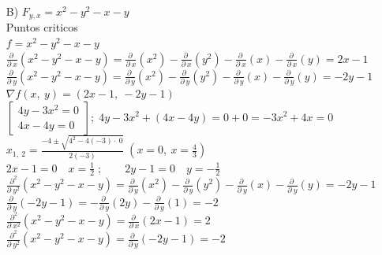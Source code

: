 \documentclass[13pt]{memoir}
\begin{document}
\begin{enumerate}
\item[B)] $F_{y,x}= x^2-y^2-x-y$\\

{\tiny Puntos criticos}\\
$f=x^2-y^2-x-y$\\
$\frac{\partial \:}{\partial \:x}\left(x^2-y^2-x-y\right) =\frac{\partial \:}{\partial \:x}\left(x^2\right)-\frac{\partial \:}{\partial \:x}\left(y^2\right)-\frac{\partial \:}{\partial \:x}\left(x\right)-\frac{\partial \:}{\partial \:x}\left(y\right) = 2x-1$\\
$\frac{\partial \:}{\partial \:y}\left(x^2-y^2-x-y\right) =\frac{\partial \:}{\partial \:y}\left(x^2\right)-\frac{\partial \:}{\partial \:y}\left(y^2\right)-\frac{\partial \:}{\partial \:y}\left(x\right)-\frac{\partial \:}{\partial \:y}\left(y\right) =-2y-1 $\\

$\nabla f\left(x,\:y\right)=\left(2x-1,\:-2y-1\right)$\\

$\begin{bmatrix}4y-3x^2=0\\ 4x-4y=0\end{bmatrix}; \; 4y-3x^2+\left(4x-4y\right)=0+0 = -3x^2+4x=0$\\

$x_{1,\:2}=\frac{-4\pm \sqrt{4^2-4\left(-3\right)\cdot \:0}}{2\left(-3\right)} \; (x=0,\:x=\frac{4}{3})$\\

$2x-1=0 \quad x=\frac{1}{2} \;; \qquad 2y-1=0\quad y=-\frac{1}{2}$\\

$\frac{\partial ^2}{\partial \:y^2}\left(x^2-y^2-x-y\right) =\frac{\partial \:}{\partial \:y}\left(x^2\right)-\frac{\partial \:}{\partial \:y}\left(y^2\right)-\frac{\partial \:}{\partial \:y}\left(x\right)-\frac{\partial \:}{\partial \:y}\left(y\right) =-2y-1$\\
$\frac{\partial \:}{\partial \:y}\left(-2y-1\right) =-\frac{\partial \:}{\partial \:y}\left(2y\right)-\frac{\partial \:}{\partial \:y}\left(1\right) =-2 $\\


$\frac{\partial ^2}{\partial \:x^2}\left(x^2-y^2-x-y\right)=\frac{\partial \:}{\partial \:x}\left(2x-1\right)=2$\\

$\frac{\partial ^2}{\partial \:y^2}\left(x^2-y^2-x-y\right) =\frac{\partial \:}{\partial \:y}\left(-2y-1\right)=-2$\\


\end{enumerate}
\end{document}
